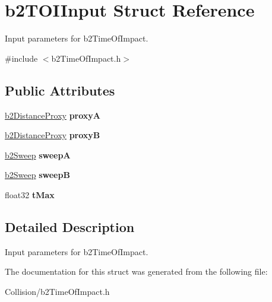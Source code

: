 \hypertarget{structb2TOIInput}{}\section{b2\+T\+O\+I\+Input Struct Reference}
\label{structb2TOIInput}


Input parameters for b2\+Time\+Of\+Impact.  




{\ttfamily \#include $<$b2\+Time\+Of\+Impact.\+h$>$}

\subsection*{Public Attributes}
\begin{DoxyCompactItemize}
\item 
\mbox{\label{structb2TOIInput_a5c5fb931435d92ac2d2080552400cd57}} 
\mbox{\hyperlink{structb2DistanceProxy}{b2\+Distance\+Proxy}} {\bfseries proxyA}
\item 
\mbox{\label{structb2TOIInput_a7f4e614d1c574006402e9610c984a93f}} 
\mbox{\hyperlink{structb2DistanceProxy}{b2\+Distance\+Proxy}} {\bfseries proxyB}
\item 
\mbox{\label{structb2TOIInput_adf63a4b9969aa839c2d520bf6d76148a}} 
\mbox{\hyperlink{structb2Sweep}{b2\+Sweep}} {\bfseries sweepA}
\item 
\mbox{\label{structb2TOIInput_af506b6adc7eca852f08460ec76c7b9a7}} 
\mbox{\hyperlink{structb2Sweep}{b2\+Sweep}} {\bfseries sweepB}
\item 
\mbox{\label{structb2TOIInput_a365a434996de60957777a673918d3a5f}} 
float32 {\bfseries t\+Max}
\end{DoxyCompactItemize}


\subsection{Detailed Description}
Input parameters for b2\+Time\+Of\+Impact. 

The documentation for this struct was generated from the following file\+:\begin{DoxyCompactItemize}
\item 
Collision/b2\+Time\+Of\+Impact.\+h\end{DoxyCompactItemize}
